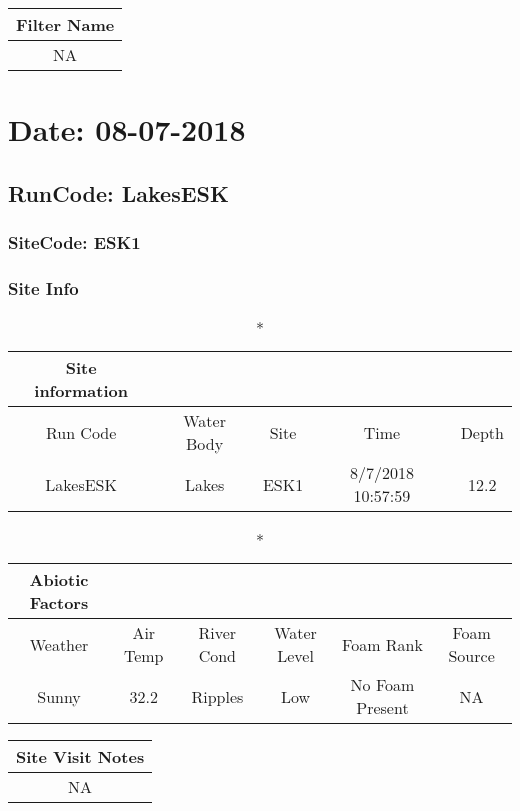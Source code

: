 \documentclass[
  letterpaper,
  DIV=11,
  numbers=noendperiod]{scrartcl}
\begin{document}
\begin{longtable*}{c}
\toprule
Filter Name \\ 
\midrule\addlinespace[2.5pt]
NA \\ 
\bottomrule
\end{longtable*}

\hypertarget{date-08-07-2018}{%
\section{Date: 08-07-2018}\label{date-08-07-2018}}

\hypertarget{runcode-lakesesk}{%
\subsection{RunCode: LakesESK}\label{runcode-lakesesk}}

\hypertarget{sitecode-esk1}{%
\subsubsection{SiteCode: ESK1}\label{sitecode-esk1}}

\subsubsection{Site Info}

\begin{longtable*}{ccccc}
\caption*{
{\large Site information}
} \\ 
\toprule
Run Code & Water Body & Site & Time & Depth \\ 
\midrule\addlinespace[2.5pt]
LakesESK & Lakes & ESK1 & 8/7/2018 10:57:59 & 12.2 \\ 
\bottomrule
\end{longtable*}

\begin{longtable*}{cccccc}
\caption*{
{\large Abiotic Factors}
} \\ 
\toprule
Weather & Air Temp & River Cond & Water Level & Foam Rank & Foam Source \\ 
\midrule\addlinespace[2.5pt]
Sunny & 32.2 & Ripples & Low & No Foam Present & NA \\ 
\bottomrule
\end{longtable*}

\begin{longtable*}{c}
\toprule
Site Visit Notes \\ 
\midrule\addlinespace[2.5pt]
NA \\ 
\bottomrule
\end{longtable*}
\end{document}
